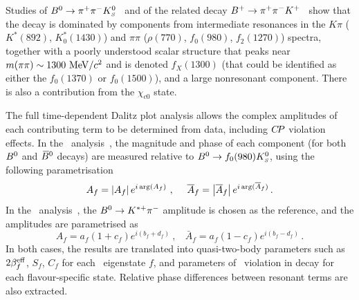 \mysubsubsubsection{$\Bz \to \pi^+\pi^-\KS$
}
\label{sec:cp_uta:notations:dalitz:pipik0}

Studies of $\Bz \to \pi^+\pi^-\KS$~\cite{Aubert:2009me,:2008wwa}
and of the related decay
$B^{+} \to \pi^+\pi^-K^+$~\cite{Garmash:2004wa,Garmash:2005rv,Aubert:2005ce,Aubert:2008bj}
show that the decay is dominated by components from intermediate resonances 
in the $K\pi$ ($K^*(892)$, $K^*_0(1430)$) 
and $\pi\pi$ ($\rho(770)$, $f_0(980)$, $f_2(1270)$) spectra,
together with a poorly understood scalar structure that peaks near 
$m(\pi\pi) \sim 1300 \ {\rm MeV}/c^2$ and is denoted $f_X(1300)$
(that could be identified as either the $f_0(1370)$ or $f_0(1500)$),
and a large nonresonant component.
There is also a contribution from the $\chi_{c0}$ state.

The full time-dependent Dalitz plot analysis allows 
the complex amplitudes of each contributing term to be determined from data,
including $C\!P$ violation effects.
In the \babar\ analysis~\cite{Aubert:2009me}, 
the magnitude and phase of each component (for both $B^0$ and $\kern 0.18em\overline{\kern -0.18em B}{}^0$ decays) 
are measured relative to $B^0 \to f_0(980)K^0_{\scriptscriptstyle S}$, using the following
parametrisation
\begin{equation}
  A_f = \left| A_f \right| e^{i\,{\rm arg}(A_f)}
  \ , \ \ \ \ 
  \bar{A}_f = \left| \bar{A}_f \right| e^{i\,{\rm arg}(\bar{A}_f)} \, .
\end{equation}
In the \belle\ analysis~\cite{:2008wwa}, the $B^0 \to K^{*+}\pi^-$ amplitude
is chosen as the reference, and the amplitudes are parametrised as 
\begin{equation}
  A_f = a_f ( 1 + c_f ) e^{i ( b_f + d_f )} 
  \ , \ \ \ \ 
  \bar{A}_f = a_f ( 1 - c_f ) e^{i ( b_f - d_f )} \, .
\end{equation}
In both cases, the results are translated into quasi-two-body parameters 
such as $2\beta^{\rm eff}_f$, $S_f$, $C_f$ for each \CP\ eigenstate $f$,
and parameters of \CP\ violation in decay for each flavour-specific state.
Relative phase differences between resonant terms are also extracted.

\label{sec:cp_uta:notations:dalitz:pipipi0}

